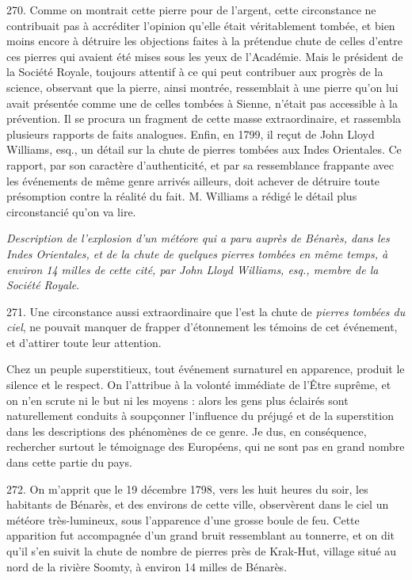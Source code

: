 \documentclass[a4paper, 11pt, oneside, polutonikogreek, french]{article}
\begin{document}
270. \og Comme on montrait cette pierre pour de l'argent, cette circonstance ne contribuait pas à accréditer l'opinion qu'elle était véritablement tombée, et bien moins encore à détruire les objections faites à la prétendue chute de celles d'entre ces pierres qui avaient été mises sous les yeux de l'Académie. Mais le président de la Société Royale, toujours attentif à ce qui peut contribuer aux progrès de la science, observant que la pierre, ainsi montrée, ressemblait à une pierre qu'on lui avait présentée comme une de celles tombées à Sienne, n'était pas accessible à la prévention. Il se procura un fragment de cette masse extraordinaire, et rassembla plusieurs rapports de faits analogues. Enfin, en 1799, il reçut de John Lloyd Williams, esq., un détail sur la chute de pierres tombées aux Indes Orientales. Ce rapport, par son caractère d'authenticité, et par sa ressemblance frappante avec les événements de même genre arrivés ailleurs, doit achever de détruire toute présomption contre la réalité du fait. M. Williams a rédigé le détail plus circonstancié qu'on va lire.

\begin{center}
\emph{Description de l'explosion d'un météore qui a paru auprès de Bénarès, dans les Indes Orientales, et de la chute de quelques pierres tombées en même temps, à environ 14 milles de cette cité, par John Lloyd Williams, esq., membre de la Société Royale}.
\end{center}

271. \og Une circonstance aussi extraordinaire que l'est la chute de \emph{pierres tombées du ciel}, ne pouvait manquer de frapper d'étonnement les témoins de cet événement, et d'attirer toute leur attention. \fg

Chez un peuple superstitieux, tout événement surnaturel en apparence, produit le silence et le respect. On l'attribue à la volonté immédiate de l'Être suprême, et on n'en scrute ni le but ni les moyens : alors les gens plus éclairés sont naturellement conduits à soupçonner l'influence du préjugé et de la superstition dans les descriptions des phénomènes de ce genre. Je dus, en conséquence, rechercher surtout le témoignage des Européens, qui ne sont pas en grand nombre dans cette partie du pays.

272. On m'apprit que le 19 décembre 1798, vers les huit heures du soir, les habitants de Bénarès, et des environs de cette ville, observèrent dans le ciel un météore très-lumineux, sous l'apparence d'une grosse boule de feu. Cette apparition fut accompagnée d'un grand bruit ressemblant au tonnerre, et on dit qu'il s'en suivit la chute de nombre de pierres près de Krak-Hut, village situé au nord de la rivière Soomty, à environ 14 milles de Bénarès.
\end{document}
